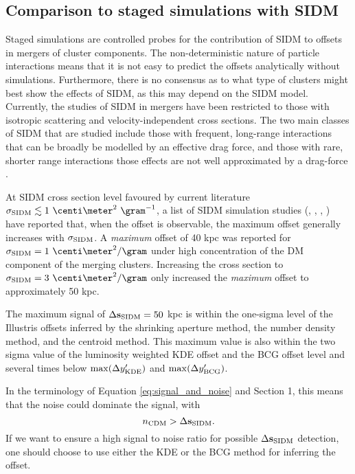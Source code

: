 \documentclass[usenatbib]{mn2e}
\newcommand{\sigmaSIDM}{\sigma_{\rm SIDM}}
\newcommand{\offset}{\Delta {\bf s}}
\newcommand{\SIDM}{{\rm SIDM}}
\begin{document}
{ 
\subsection{Comparison to staged simulations with SIDM}
\label{subsec:SIDM_sim}
Staged simulations are controlled probes for the contribution
of SIDM to offsets in mergers of cluster components. 
The non-deterministic nature of particle interactions means that it is not easy
to predict the offsets analytically without simulations.
Furthermore, there is no consensus as to what type of clusters might best show the
effects of SIDM, as this may depend on the SIDM model. 
Currently, the studies of SIDM in mergers have been restricted to those with isotropic
scattering and velocity-independent cross sections.   
The two main classes of SIDM that are studied include those with 
frequent, long-range interactions that can be broadly be modelled by an
effective drag force, and those with rare, shorter range interactions those
effects are not well approximated by a drag-force \citep{Kahlhoefer14}. 

At SIDM cross section level favoured by current literature $\sigmaSIDM
\lesssim 1~\centi\meter^2 ~\gram^{-1}$, a list of SIDM simulation studies (\citealt{Kim:2016}, \citealt{Robertson2016}, \citealt{Kahlhoefer14}, \citealt{Randall2008d})
have reported that, when the offset is observable, 
the maximum offset generally increases with $\sigmaSIDM$. 
A {\it maximum} offset of 40 kpc was reported for $\sigmaSIDM = 1
~\centi\meter^2 / \gram$ under high concentration of the DM component of the 
merging clusters. Increasing the cross section to $\sigmaSIDM = 3
~\centi\meter^2 / \gram$ only increased the {\it maximum} offset to 
approximately 50 kpc.

The maximum signal of $\offset_\SIDM = 50$ kpc is within 
the one-sigma level of the Illustris offsets 
inferred by the shrinking aperture method, the number density method, and the
centroid method. This maximum value is also within the two sigma value of the
luminosity weighted KDE offset and the BCG offset level and several times below
$\max(\Delta y_{\rm KDE}')$ and $\max(\Delta y_{\rm BCG}')$. 

In the terminology of Equation \ref{eq:signal_and_noise} and Section 1, this means that the noise could dominate the signal, with 
\begin{equation}
	n_{\rm CDM} > \offset_\SIDM.
\end{equation}
If we want to ensure a high signal to noise ratio for possible
$\offset_\SIDM$ detection, one should choose to use either the KDE or the 
BCG method for inferring the offset.

}
\end{document}
